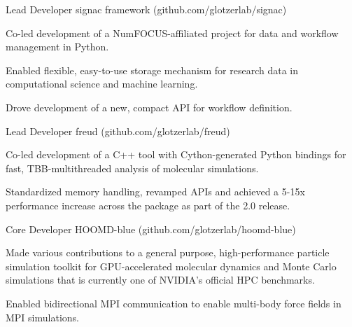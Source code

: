 \begin{cventries}
  \cventry
    {Lead Developer} %
    {signac framework ({\tiny github.com/glotzerlab/signac})} %
    {} %
    {} %
    {
      \begin{cvitems} %
        \item Co-led development of a NumFOCUS-affiliated project for data and workflow management in Python.
        \item Enabled flexible, easy-to-use storage mechanism for research data in computational science and machine learning.
        \item Drove development of a new, compact API for workflow definition.
      \end{cvitems}
    }
  \cventry
    {Lead Developer} %
    {freud ({\tiny github.com/glotzerlab/freud})} %
    {} %
    {} %
    {
      \begin{cvitems} %
        \item Co-led development of a C++ tool with Cython-generated Python bindings for fast, TBB-multithreaded analysis of molecular simulations.
        \item Standardized memory handling, revamped APIs and achieved a 5-15x performance increase across the package as part of the 2.0 release. 
      \end{cvitems}
    }
  \cventry
    {Core Developer} %
    {HOOMD-blue ({\tiny github.com/glotzerlab/hoomd-blue})} %
    {} %
    {} %
    {
      \begin{cvitems} %
        \item Made various contributions to a general purpose, high-performance particle simulation toolkit for GPU-accelerated molecular dynamics and Monte Carlo simulations that is currently one of NVIDIA's official HPC benchmarks.
        \item Enabled bidirectional MPI communication to enable multi-body force fields in MPI simulations.

\end{cvitems}}
\end{cventries}
